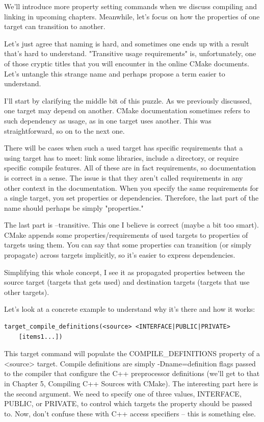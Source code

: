 We'll introduce more property setting commands when we discuss compiling and linking in upcoming chapters. Meanwhile, let's focus on how the properties of one target can transition to another.


Let's just agree that naming is hard, and sometimes one ends up with a result that's hard to understand. "Transitive usage requirements" is, unfortunately, one of those cryptic titles that you will encounter in the online CMake documents. Let's untangle this strange name and perhaps propose a term easier to understand.

I'll start by clarifying the middle bit of this puzzle. As we previously discussed, one target may depend on another. CMake documentation sometimes refers to such dependency as usage, as in one target uses another. This was straightforward, so on to the next one.

There will be cases when such a used target has specific requirements that a using target has to meet: link some libraries, include a directory, or require specific compile features. All of these are in fact requirements, so documentation is correct in a sense. The issue is that they aren't called requirements in any other context in the documentation. When you specify the same requirements for a single target, you set properties or dependencies. Therefore, the last part of the name should perhaps be simply "properties."

The last part is –transitive. This one I believe is correct (maybe a bit too smart). CMake appends some properties/requirements of used targets to properties of targets using them. You can say that some properties can transition (or simply propagate) across targets implicitly, so it's easier to express dependencies.

Simplifying this whole concept, I see it as propagated properties between the source target (targets that gets used) and destination targets (targets that use other targets).

Let's look at a concrete example to understand why it's there and how it works:

\begin{lstlisting}[style=styleCMake]
target_compile_definitions(<source> <INTERFACE|PUBLIC|PRIVATE> 
	[items1...])
\end{lstlisting}

This target command will populate the COMPILE\_DEFINITIONS property of a <source> target. Compile definitions are simply -Dname=definition flags passed to the compiler that configure the C++ preprocessor definitions (we'll get to that in Chapter 5, Compiling C++ Sources with CMake). The interesting part here is the second argument. We need to specify one of three values, INTERFACE, PUBLIC, or PRIVATE, to control which targets the property should be passed to. Now, don't confuse these with C++ access specifiers – this is something else.

